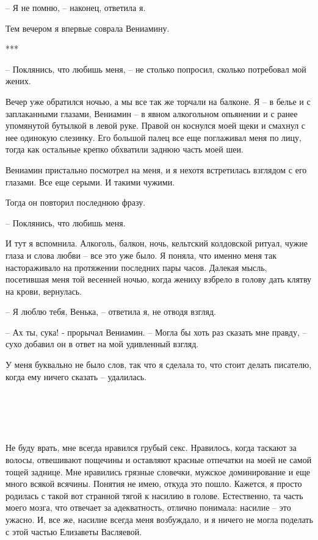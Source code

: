 \documentclass[
]{book}
\begin{document}
-- Я не помню, -- наконец, ответила я.

Тем вечером я впервые соврала Вениамину.

***

-- Поклянись, что любишь меня, -- не столько попросил, сколько потребовал мой жених.

Вечер уже обратился ночью, а мы все так же торчали на балконе. Я -- в белье и с заплаканными глазами, Вениамин -- в явном алкогольном опьянении и с ранее упомянутой бутылкой в левой руке. Правой он коснулся моей щеки и смахнул с нее одинокую слезинку. Его большой палец все еще поглаживал меня по лицу, тогда как остальные крепко обхватили заднюю часть моей шеи.

Вениамин пристально посмотрел на меня, и я нехотя встретилась взглядом с его глазами. Все еще серыми. И такими чужими.

Тогда он повторил последнюю фразу.

-- Поклянись, что любишь меня.

И тут я вспомнила. Алкоголь, балкон, ночь, кельтский колдовской ритуал, чужие глаза и слова любви -- все это уже было. Я поняла, что именно меня так настораживало на протяжении последних пары часов. Далекая мысль, посетившая меня той весенней ночью, когда жениху взбрело в голову дать клятву на крови, вернулась.

-- Я люблю тебя, Венька, -- ответила я, не отводя взгляд.

-- Ах ты, сука! - прорычал Вениамин. -- Могла бы хоть раз сказать мне правду, -- сухо добавил он в ответ на мой удивленный взгляд.

У меня буквально не было слов, так что я сделала то, что стоит делать писателю, когда ему ничего сказать -- удалилась.

\hypertarget{chapter-52}{%
\chapter{~}\label{chapter-52}}

Не буду врать, мне всегда нравился грубый секс. Нравилось, когда таскают за волосы, отвешивают пощечины и оставляют красные отпечатки на моей не самой тощей заднице. Мне нравились грязные словечки, мужское доминирование и еще много всякой всячины. Понятия не имею, откуда это пошло. Кажется, я просто родилась с такой вот странной тягой к насилию в голове. Естественно, та часть моего мозга, что отвечает за адекватность, отлично понимала: насилие -- это ужасно. И, все же, насилие всегда меня возбуждало, и я ничего не могла поделать с этой частью Елизаветы Васляевой.
\end{document}
